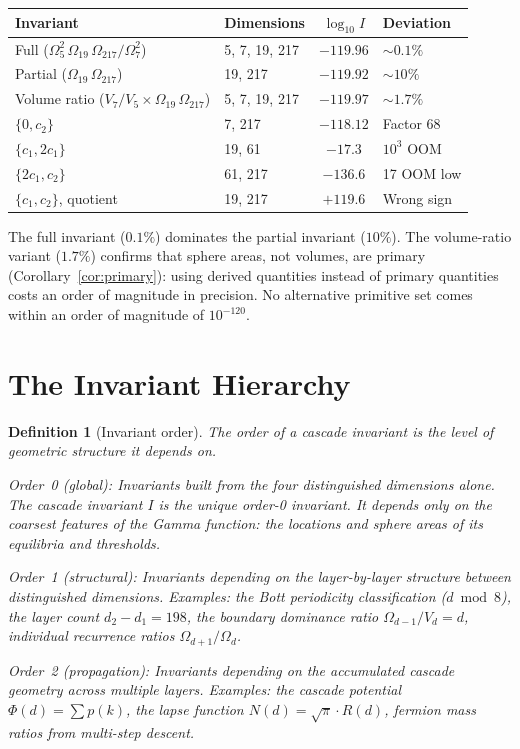 \documentclass[11pt,a4paper]{article}
\newtheorem{definition}[theorem]{Definition}
\begin{document}
\begin{center}
\begin{tabular}{llcl}
\toprule
Invariant & Dimensions & $\log_{10} I$ & Deviation \\
\midrule
Full ($\Omega_5^2\,\Omega_{19}\,\Omega_{217}/\Omega_7^2$)
& 5, 7, 19, 217 & $-119.96$ & $\sim 0.1\%$ \\
Partial ($\Omega_{19}\,\Omega_{217}$)
& 19, 217 & $-119.92$ & $\sim 10\%$ \\
Volume ratio ($V_7/V_5\times\Omega_{19}\,\Omega_{217}$)
& 5, 7, 19, 217 & $-119.97$ & $\sim 1.7\%$ \\
$\{0, c_2\}$ & 7, 217 & $-118.12$ & Factor 68 \\
$\{c_1, 2c_1\}$ & 19, 61 & $-17.3$ & $10^{3}$ OOM \\
$\{2c_1, c_2\}$ & 61, 217 & $-136.6$ & 17 OOM low \\
$\{c_1, c_2\}$, quotient & 19, 217 & $+119.6$ & Wrong sign \\
\bottomrule
\end{tabular}
\end{center}

The full invariant ($0.1\%$) dominates the partial invariant ($10\%$). The
volume-ratio variant ($1.7\%$) confirms that sphere areas, not volumes, are
primary (Corollary~\ref{cor:primary}): using derived quantities instead of
primary quantities costs an order of magnitude in precision. No alternative
primitive set comes within an order of magnitude of $10^{-120}$.

\section{The Invariant Hierarchy}

\begin{definition}[Invariant order]\label{def:order}
The \emph{order} of a cascade invariant is the level of geometric
structure it depends on.

\emph{Order~0 (global):} Invariants built from the four distinguished
dimensions alone. The cascade invariant $I$ is the unique order-0
invariant. It depends only on the coarsest features of the Gamma
function: the locations and sphere areas of its equilibria and thresholds.

\emph{Order~1 (structural):} Invariants depending on the layer-by-layer
structure between distinguished dimensions. Examples: the Bott periodicity
classification ($d\bmod 8$), the layer count $d_2 - d_1 = 198$, the
boundary dominance ratio $\Omega_{d-1}/V_d = d$, individual recurrence
ratios $\Omega_{d+1}/\Omega_d$.

\emph{Order~2 (propagation):} Invariants depending on the accumulated
cascade geometry across multiple layers. Examples: the cascade potential
$\Phi(d) = \sum p(k)$, the lapse function $N(d) = \sqrt{\pi}\cdot R(d)$,
fermion mass ratios from multi-step descent.
\end{definition}
\end{document}
